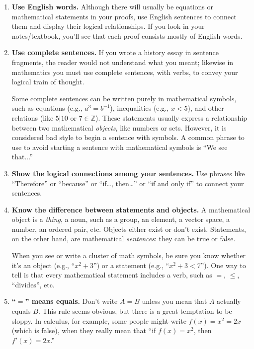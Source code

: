\begin{enumerate}
\item \textbf{Use English words.} Although there will usually be equations or mathematical statements in your proofs, use English sentences to connect them and display their logical relationships. If you look in your notes/textbook, you'll see that each proof consists mostly of English words.

\item \textbf{Use complete sentences.} If you wrote a history essay in sentence fragments, the reader would not understand what you meant; likewise in mathematics you must use complete sentences, with verbs, to convey your logical train of thought.

Some complete sentences can be written purely in mathematical symbols, such as equations (e.g., \(a^3=b^{-1}\)), inequalities (e.g., \(x<5\)), and other relations (like \(5\big|10\) or \(7\in\mathbb{Z}\)). These statements usually express a relationship between two mathematical \emph{objects}, like numbers or sets.  However, it is considered bad style to begin a sentence with symbols.  A common phrase to use to avoid starting a sentence with mathematical symbols is ``We see that...''

\item \textbf{Show the logical connections among your sentences.} Use phrases like ``Therefore'' or ``because'' or ``if\ldots, then\ldots'' or ``if and only if'' to connect your sentences.
  
\item \textbf{Know the difference between statements and objects.} A mathematical object is a \emph{thing}, a noun, such as a group, an element, a vector space, a number, an ordered pair, etc. Objects either exist or don't exist. Statements, on the other hand, are mathematical \emph{sentences}:  they can be true or false.

When you see or write a cluster of math symbols, be sure you know  whether it's an object (e.g., ``\(x^2+3\)'') or a statement (e.g., ``\(x^2+3<7\)''). One way to tell is that every mathematical statement includes a verb, such as \(=\), \(\leq\), ``divides'', etc.

\item \textbf{``\(=\)'' means equals.} Don't write \(A=B\) unless you mean that \(A\) actually equals \(B\). This rule seems obvious, but there is a great temptation to be sloppy.  In calculus, for example, some people might write \(f(x)=x^{2}=2x\) (which is false), when they really mean that ``if \(f(x)=x^{2}\), then \(f'(x)=2x\).''


\end{enumerate}
